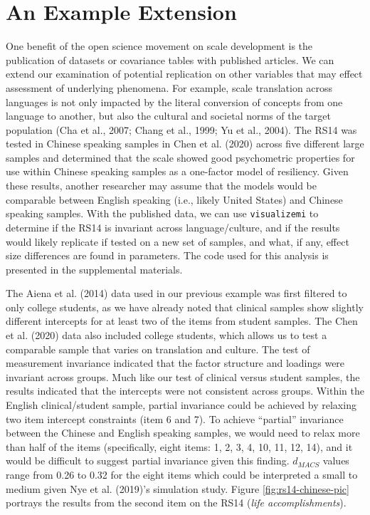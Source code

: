 \documentclass[
  man]{apa7}
\begin{document}
\section{An Example Extension}\label{an-example-extension}

One benefit of the open science movement on scale development is the publication of datasets or covariance tables with published articles. We can extend our examination of potential replication on other variables that may effect assessment of underlying phenomena. For example, scale translation across languages is not only impacted by the literal conversion of concepts from one language to another, but also the cultural and societal norms of the target population (Cha et al., 2007; Chang et al., 1999; Yu et al., 2004). The RS14 was tested in Chinese speaking samples in Chen et al. (2020) across five different large samples and determined that the scale showed good psychometric properties for use within Chinese speaking samples as a one-factor model of resiliency. Given these results, another researcher may assume that the models would be comparable between English speaking (i.e., likely United States) and Chinese speaking samples. With the published data, we can use \texttt{visualizemi} to determine if the RS14 is invariant across language/culture, and if the results would likely replicate if tested on a new set of samples, and what, if any, effect size differences are found in parameters. The code used for this analysis is presented in the supplemental materials.

The Aiena et al. (2014) data used in our previous example was first filtered to only college students, as we have already noted that clinical samples show slightly different intercepts for at least two of the items from student samples. The Chen et al. (2020) data also included college students, which allows us to test a comparable sample that varies on translation and culture. The test of measurement invariance indicated that the factor structure and loadings were invariant across groups. Much like our test of clinical versus student samples, the results indicated that the intercepts were not consistent across groups. Within the English clinical/student sample, partial invariance could be achieved by relaxing two item intercept constraints (item 6 and 7). To achieve ``partial'' invariance between the Chinese and English speaking samples, we would need to relax more than half of the items (specifically, eight items: 1, 2, 3, 4, 10, 11, 12, 14), and it would be difficult to suggest partial invariance given this finding. \(d_{MACS}\) values range from 0.26 to 0.32 for the eight items which could be interpreted a small to medium given Nye et al. (2019)'s simulation study. Figure \ref{fig:rs14-chinese-pic} portrays the results from the second item on the RS14 (\emph{life accomplishments}).
\end{document}
